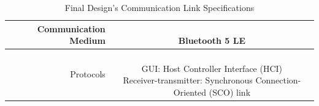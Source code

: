 \documentclass[12pt]{article}
\begin{document}
\begin{table}[h!]
\centering
\caption{Final Design's Communication Link Specifications}
\begin{tabular} {| r | c | }
\hline
\parbox{0.3\linewidth}{\raggedleft
 Communication Medium
} &   \parbox{0.65\linewidth}{\hfill \\
Bluetooth 5 LE
}\\
\hline
\parbox{0.3\linewidth}{\raggedleft
Protocols
} &   \parbox{0.65\linewidth}{\hfill \\
GUI: Host Controller Interface (HCI)\\
Receiver-\>transmitter: Synchronous Connection-Oriented (SCO) link
}\\
\hline
%
%
\end{tabular}
\end{table}
\hfill \\
\end{document}
